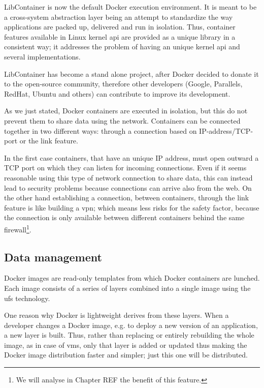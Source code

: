 LibContainer is now the default Docker execution environment. It is meant to be a cross-system abstraction
layer being an attempt to standardize the way applications are packed up, delivered and run in isolation.
Thus, container features available in Linux kernel \acs{api} are provided as a unique library in a
consistent way; it addresses the problem of having an unique kernel \acs{api} and several implementations.

LibContainer has become a stand alone project, after Docker decided to donate it to the open-source community,
therefore other developers (Google, Parallels, RedHat, Ubuntu and others) can contribute to improve its development.

As we just stated, Docker containers are executed in isolation, but this do not prevent them to share data using
the network. Containers can be connected together in two different ways: through a connection based on 
IP-address/TCP-port or the link feature.

In the first case containers, that have an unique IP address, must open outward a TCP port on which they can
listen for incoming connections. Even if it seems reasonable using this type of network connection to share
data, this can instead lead to security problems because connections can arrive also from the web. On the other
hand establishing a connection, between containers, through the link feature is like building a \ac{vpn};
which means less risks for the safety factor, because the connection is only available between different
containers behind the same firewall\footnote{We will analyse in Chapter REF the benefit of this feature.}.

\subsection{Data management}
\label{sec:problemSpace-docker-dataManagement}
Docker images are read-only templates from which Docker containers are lunched. Each image consists of
a series of layers combined into a single image using the \acf{ufs} technology.

One reason why Docker is lightweight derives from these layers. When a developer changes a Docker image,
e.g. to deploy a new version of an application, a new layer is built. Thus, rather than replacing
or entirely rebuilding the whole image, as in case of \ac{vm}s, only that layer is added or updated thus
making the Docker image distribution faster and simpler; just this one will be distributed.

